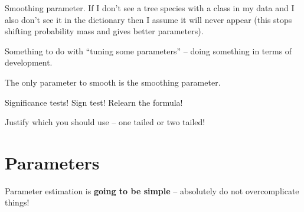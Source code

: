 \documentclass[10pt, a4paper]{article}
\begin{document}
Smoothing parameter. If I don't see a tree species with a class in my data and I also don't see it in the dictionary
then I assume it will never appear (this stops shifting probability mass and gives better parameters).

Something to do with ``tuning some parameters'' -- doing something in terms of development.

The only parameter to smooth is the smoothing parameter.

Significance tests! Sign test! Relearn the formula!

Justify which you should use -- one tailed or two tailed!

\section{Parameters}

Parameter estimation is \textbf{going to be simple} -- absolutely do not overcomplicate things!
\end{document}
